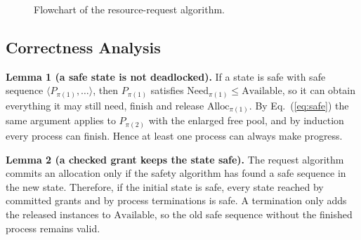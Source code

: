 \documentclass[11pt,a4paper]{report}
\begin{document}
\begin{figure}[h!]
\centering
{}
\caption{Flowchart of the resource-request algorithm.}
\label{fig:requestflow}
\end{figure}

\subsection{Correctness Analysis}
\textbf{Lemma 1 (a safe state is not deadlocked).} If a state is safe with safe sequence $\langle P_{\pi(1)},\dots\rangle$, then $P_{\pi(1)}$ satisfies $\text{Need}_{\pi(1)}\le\text{Available}$, so it can obtain everything it may still need, finish and release $\text{Alloc}_{\pi(1)}$. By Eq.~(\ref{eq:safe}) the same argument applies to $P_{\pi(2)}$ with the enlarged free pool, and by induction every process can finish. Hence at least one process can always make progress.

\textbf{Lemma 2 (a checked grant keeps the state safe).} The request algorithm commits an allocation only if the safety algorithm has found a safe sequence in the new state. Therefore, if the initial state is safe, every state reached by committed grants and by process terminations is safe. A termination only adds the released instances to $\text{Available}$, so the old safe sequence without the finished process remains valid.
\end{document}
